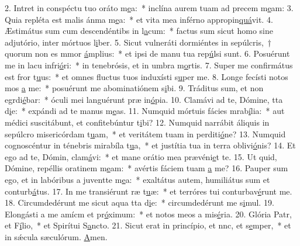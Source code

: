 2. Intret in conspéctu tuo oráto m\uline{e}a:~* inclína aurem tuam ad precem m\uline{e}am:
3. Quia repléta est malis ánma m\uline{e}a:~* et vita mea inférno appropin\uline{quá}vit.
4. Æstimátus sum cum descendéntibs in l\uline{a}cum:~* factus sum sicut homo sine adjutório, inter mórtuos l\uline{i}ber.
5. Sicut vulneráti dormiéntes in sepúlcris,~† quorum non es mmor \uline{á}mplius:~* et ipsi de manu tua rep\uline{ú}lsi sunt.
6. Posuérunt me in lacu infri\uline{ó}ri:~* in tenebrósis, et in umbra m\uline{o}rtis.
7. Super me confirmátus est fror t\uline{u}us:~* et omnes fluctus tuos induxísti s\uline{u}per me.
8. Longe fecísti notos mos \uline{a} me:~* posuérunt me abominatiónem s\uline{i}bi.
9. Tráditus sum, et non egrdi\uline{é}bar:~* óculi mei languérunt præ in\uline{ó}pia.
10. Clamávi ad te, Dómine, tta d\uline{i}e:~* expándi ad te manus m\uline{e}as.
11. Numquid mórtuis fácies mrab\uline{í}lia:~* aut médici suscitábunt, et confitebúntur t\uline{i}bi?
12. Numquid narrábit áliquis in sepúlcro misericórdam t\uline{u}am,~* et veritátem tuam in perditi\uline{ó}ne?
13. Numquid cognoscéntur in ténebris mirabíla t\uline{u}a,~* et justítia tua in terra oblivi\uline{ó}nis?
14. Et ego ad te, Dómin, clam\uline{á}vi:~* et mane orátio mea prævéni\uline{e}t te.
15. Ut quid, Dómine, repéllis oratinem m\uline{e}am:~* avértis fáciem tuam \uline{a} me?
16. Pauper sum ego, et in labóribus a juventte m\uline{e}a:~* exaltátus autem, humiliátus sum et conturb\uline{á}tus.
17. In me transiérunt ræ t\uline{u}æ:~* et terróres tui conturbav\uline{é}runt me.
18. Circumdedérunt me sicut aqua tta d\uline{i}e:~* circumdedérunt me s\uline{i}mul.
19. Elongásti a me amícm et pr\uline{ó}ximum:~* et notos meos a mis\uline{é}ria.
20. Glória Patr, et F\uline{í}lio,~* et Spirítui S\uline{a}ncto.
21. Sicut erat in princípio, et nnc, et s\uline{e}mper,~* et in sǽcula sæculórum. \uline{A}men.

